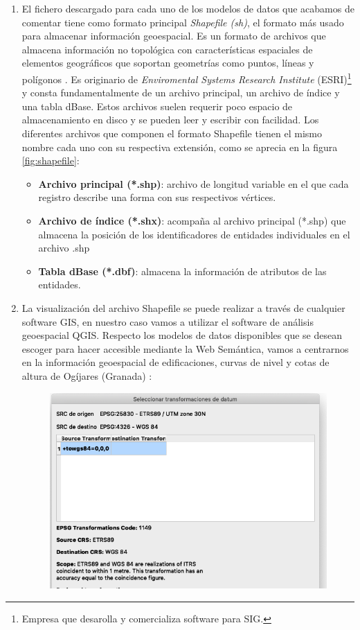 \begin{enumerate}
	\item El fichero descargado para cada uno de los modelos de datos que acabamos de comentar tiene como formato principal \textit{Shapefile (sh)}, el formato más usado para almacenar información geoespacial. Es un formato de archivos que almacena información no topológica con características espaciales de elementos geográficos que soportan geometrías como puntos, líneas y polígonos \cite{tesis}.  Es originario de \textit{Enviromental Systems Research Institute} (ESRI)\footnote{Empresa que desarolla y comercializa software para SIG.} y consta fundamentalmente de un archivo principal, un archivo de índice y una tabla dBase. Estos archivos suelen requerir poco espacio de almacenamiento en disco y se pueden leer y escribir con facilidad. Los diferentes archivos que componen el formato Shapefile tienen el mismo nombre cada uno con su respectiva extensión, como se aprecia en la figura \ref{fig:shapefile}:
	

	\begin{itemize}
		\item \textbf{Archivo principal (*.shp)}: archivo de longitud variable en el que cada registro describe una forma con sus respectivos vértices. 
		
		\item \textbf{Archivo de índice (*.shx)}: acompaña al archivo principal (*.shp) que almacena la posición de los identificadores de entidades individuales en el archivo .shp 
		
		\item \textbf{Tabla dBase (*.dbf)}: almacena la información de atributos de las entidades. 
	\end{itemize}	

	\item La visualización del archivo Shapefile se puede realizar a través de cualquier software GIS, en nuestro caso vamos a utilizar el software de análisis geoespacial QGIS. Respecto los modelos de datos disponibles que se desean escoger para hacer accesible mediante la Web Semántica, vamos a centrarnos en la información geoespacial de edificaciones, curvas de nivel y cotas de altura de Ogíjares (Granada) \cite{info-sh}:
	
	\begin{figure}[H]
		\centering
		\includegraphics[width=0.7\linewidth]{imagenes/capitulo4/codificacion}
		\caption{}
		\label{fig:codificacion}
	\end{figure}
	


\end{enumerate}
